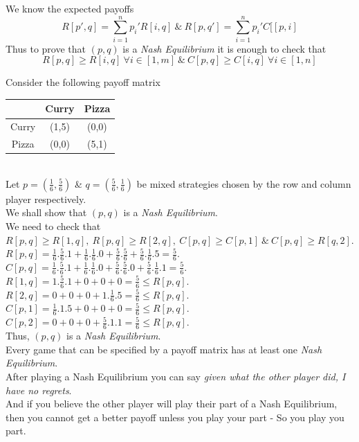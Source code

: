 \documentclass[11pt,a4paper]{article}
\begin{document}
We know the expected payoffs $$R[p',q]=\sum_{i=1}^n p_i'R[i,q]\ \&\ R[p,q']=\sum_{i=1}^n p_i'C[[p,i]$$
Thus to prove that $(p,q)$ is a \textit{Nash Equilibrium} it is enough to check that
$$R[p,q]\geq R[i,q]\ \forall i\in[1,m]\ \&\ C[p,q]\geq C[i,q]\ \forall i\in[1,n]$$

Consider the following payoff matrix\\
\begin{tabular}{|c|c|c|}
\hline
&Curry&Pizza\\
\hline
Curry&(1,5)&(0,0)\\
\hline
Pizza&(0,0)&(5,1)\\
\hline
\end{tabular}\\
Let $p=(\frac{1}{6},\frac{5}{6})$ \& $q=(\frac{5}{6},\frac{1}{6})$ be mixed strategies chosen by the row and column player respectively.\\
We shall show that $(p,q)$ is a \textit{Nash Equilibrium}.\\
We need to check that $R[p,q]\geq R[1,q],\ R[p,q]\geq R[2,q],\ C[p,q]\geq C[p,1]\ \&\ C[p,q]\geq R[q,2]$.\\
$R[p,q]=\frac{1}{6}.\frac{5}{6}.1+\frac{1}{6}.\frac{1}{6}.0+\frac{5}{6}.\frac{5}{6}+\frac{5}{6}.\frac{1}{6}.5=\frac{5}{6}$.\\
$C[p,q]=\frac{1}{6}.\frac{5}{6}.1+\frac{1}{6}.\frac{1}{6}.0+\frac{5}{6}.\frac{5}{6}.0+\frac{5}{6}.\frac{1}{6}.1=\frac{5}{6}$.\\
$R[1,q]=1.\frac{5}{6}.1+0+0+0=\frac{5}{6}\leq R[p,q]$.\\
$R[2,q]=0+0+0+1.\frac{1}{6}.5=\frac{5}{6}\leq R[p,q]$.\\
$C[p,1]=\frac{1}{6}.1.5+0+0+0=\frac{5}{6}\leq R[p,q]$.\\
$C[p,2]=0+0+0+\frac{5}{6}.1.1=\frac{5}{6}\leq R[p,q]$.\\
Thus, $(p,q)$ is a \textit{Nash Equilibrium}.\\

Every game that can be specified by a payoff matrix has at least one \textit{Nash Equilibrium}.\\

After playing a Nash Equilibrium you can say \textit{given what the other player did, I have no regrets}.\\
And if you believe the other player will play their part of a Nash Equilibrium, then you cannot get a better payoff unless you play your part - So you play you part.\\
\end{document}
